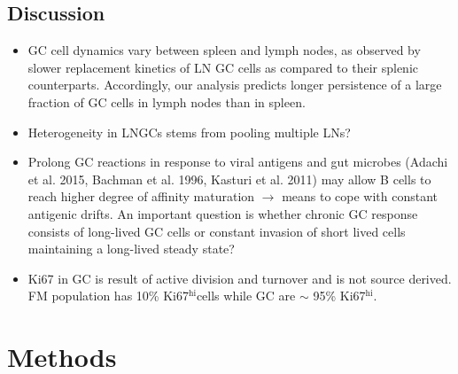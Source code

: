\documentclass[11pt]{article}
\newcommand{\ddt}[1]{\ensuremath{\frac{{\rm d}#1}{{\rm d}t}}}  %
\newcommand{\red}[1]{{\color{red}{#1}}}
\newcommand{\be}{\begin{equation}}
\newcommand{\ee}{\end{equation}}
\newcommand{\khi}{Ki67$^\text{hi}$}
\begin{document}
	\subsection*{Discussion}
	\begin{itemize}
		\item GC cell dynamics vary between spleen and lymph nodes, as observed by slower replacement kinetics of LN GC cells  as compared to their splenic counterparts.
		Accordingly, our analysis predicts longer persistence of a large fraction of GC cells in lymph nodes than in spleen.
		
		\item Heterogeneity in LNGCs stems from pooling multiple LNs?
		
		\item Prolong GC reactions in response to viral antigens and gut microbes (Adachi et al. 2015, Bachman et al. 1996, Kasturi et al. 2011) may allow B cells to reach higher degree of affinity maturation $\rightarrow$ means to cope with constant antigenic drifts. 
		An important question is whether chronic GC response consists of long-lived GC cells or constant invasion of short lived cells maintaining a long-lived steady state?
		
		\item Ki67 in GC is result of active division and turnover and is not source derived. FM population has 10\% \khi cells while GC are $\sim$ 95\% \khi. 
	\end{itemize}
	

	
\section*{Methods}

% 
% 
%	
%	
%	
%	
	
	
\end{document}
